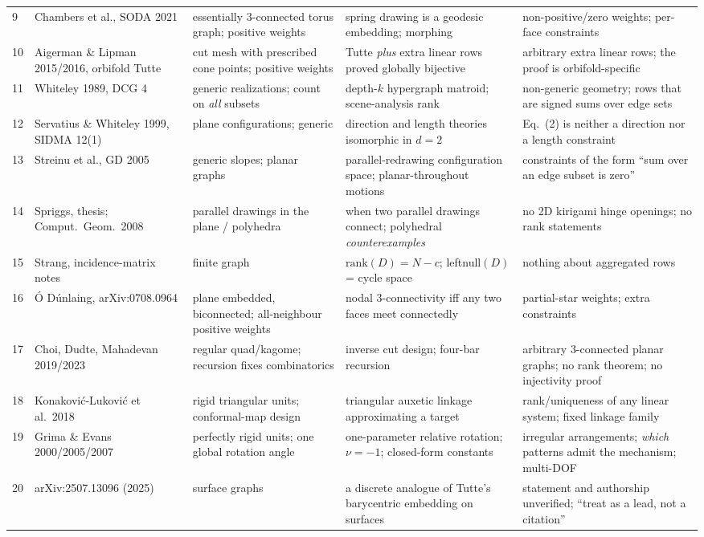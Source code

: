 \documentclass[10pt,a4paper]{article}
\begin{document}
\begin{longtable}{@{}p{6mm}p{36mm}p{40mm}p{36mm}p{42mm}@{}}
9 & Chambers et al., SODA 2021 & essentially 3-connected torus graph; positive weights & spring drawing is a geodesic embedding; morphing & non-positive/zero weights; per-face constraints \\
10 & Aigerman \& Lipman 2015/2016, orbifold Tutte & cut mesh with prescribed cone points; positive weights & Tutte \emph{plus} extra linear rows proved globally bijective & arbitrary extra linear rows; the proof is orbifold-specific \\
11 & Whiteley 1989, DCG 4 & generic realizations; count on \emph{all} subsets & depth-$k$ hypergraph matroid; scene-analysis rank & non-generic geometry; rows that are signed sums over edge sets \\
12 & Servatius \& Whiteley 1999, SIDMA 12(1) & plane configurations; generic & direction and length theories isomorphic in $d=2$ & Eq.~(2) is neither a direction nor a length constraint \\
13 & Streinu et al., GD 2005 & generic slopes; planar graphs & parallel-redrawing configuration space; planar-throughout motions & constraints of the form ``sum over an edge subset is zero'' \\
14 & Spriggs, thesis; Comput.\ Geom.\ 2008 & parallel drawings in the plane / polyhedra & when two parallel drawings connect; polyhedral \emph{counterexamples} & no 2D kirigami hinge openings; no rank statements \\
15 & Strang, incidence-matrix notes & finite graph & $\mathrm{rank}(D)=N-c$; leftnull$(D)$ = cycle space & nothing about aggregated rows \\
16 & \'O D\'unlaing, arXiv:0708.0964 & plane embedded, biconnected; all-neighbour positive weights & nodal 3-connectivity iff any two faces meet connectedly & partial-star weights; extra constraints \\
17 & Choi, Dudte, Mahadevan 2019/2023 & regular quad/kagome; recursion fixes combinatorics & inverse cut design; four-bar recursion & arbitrary 3-connected planar graphs; no rank theorem; no injectivity proof \\
18 & Konakovi\'c-Lukovi\'c et al.\ 2018 & rigid triangular units; conformal-map design & triangular auxetic linkage approximating a target & rank/uniqueness of any linear system; fixed linkage family \\
19 & Grima \& Evans 2000/2005/2007 & perfectly rigid units; one global rotation angle & one-parameter relative rotation; $\nu=-1$; closed-form constants & irregular arrangements; \emph{which} patterns admit the mechanism; multi-DOF \\
20 & arXiv:2507.13096 (2025) & surface graphs & a discrete analogue of Tutte's barycentric embedding on surfaces & statement and authorship unverified; ``treat as a lead, not a citation'' \\
\bottomrule
\end{longtable}
\end{document}
